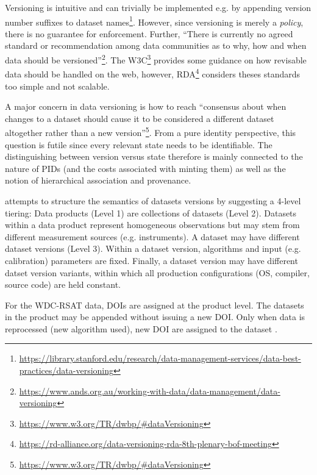\documentclass[a4paper,10pt]{article}
\begin{document}
Versioning is intuitive and can trivially be implemented e.g. by appending version number suffixes to dataset names\footnote{\url{https://library.stanford.edu/research/data-management-services/data-best-practices/data-versioning}}. 
However, since versioning is merely a \textit{policy}, there is no guarantee for enforcement. Further, ``There is currently no agreed standard or recommendation among data communities as to why, how and when data should be versioned''\footnote{\url{https://www.ands.org.au/working-with-data/data-management/data-versioning}}.
The W3C\footnote{\url{https://www.w3.org/TR/dwbp/\#dataVersioning}} provides some guidance on how revisable data should be handled on the web, however, \gls{RDA}\footnote{\url{https://rd-alliance.org/data-versioning-rda-8th-plenary-bof-meeting}} considers theses standards too simple and not scalable.

A major concern in data versioning is how to reach ``consensus about when changes to a dataset should cause it to be considered a different dataset altogether rather than a new version''\footnote{\url{https://www.w3.org/TR/dwbp/\#dataVersioning}}.
From a pure identity perspective, this question is futile since every relevant state needs to be identifiable. The distinguishing between version versus state therefore is mainly connected to the nature of \glspl{PID} (and the costs associated with minting them) \citep{Klump2016} as well as the notion of hierarchical association and provenance. 

\cite{Barkstrom2003} attempts to structure the semantics of datasets versions by suggesting a 4-level tiering: Data products (Level 1) are collections of datasets (Level 2). Datasets within a data product represent homogeneous observations but may stem from different measurement sources (e.g. instruments). A dataset may have different dataset versions (Level 3). Within a dataset version, algorithms and input (e.g. calibration) parameters are fixed. Finally, a dataset version may have different datset version variants, within which all production configurations (OS, compiler, source code) are held constant.

For the WDC-RSAT data, \glspl{DOI} are assigned at the product level. The datasets in the product may be appended without issuing a new DOI. Only when data is reprocessed (new algorithm used), new DOI are assigned to the dataset \citep{Huber2015}.
\end{document}
